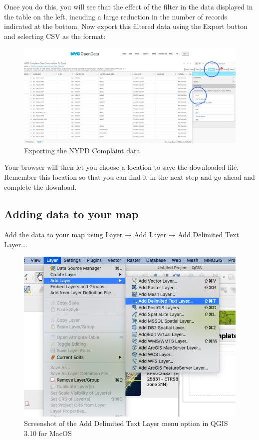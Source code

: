 \documentclass[]{book}
\begin{document}
Once you do this, you will see that the effect of the filter in the data displayed in the table on the left, incuding a large reduction in the number of records indicated at the bottom. Now export this filtered data using the Export button and selecting CSV as the format:

\begin{figure}
\centering
\includegraphics{images/NYPD_CD_visualize_export.png}
\caption{Exporting the NYPD Complaint data}
\end{figure}

Your browser will then let you choose a location to save the downloaded file. Remember this location so that you can find it in the next step and go ahead and complete the download.

\hypertarget{adding-data-to-your-map}{%
\subsection{Adding data to your map}\label{adding-data-to-your-map}}

Add the data to your map using Layer → Add Layer → Add Delimited Text Layer\ldots{}.

\begin{figure}
\centering
\includegraphics{images/add_deilmited_text_layer.png}
\caption{Screenshot of the Add Delimited Text Layer menu option in QGIS 3.10 for MacOS}
\end{figure}
\end{document}
